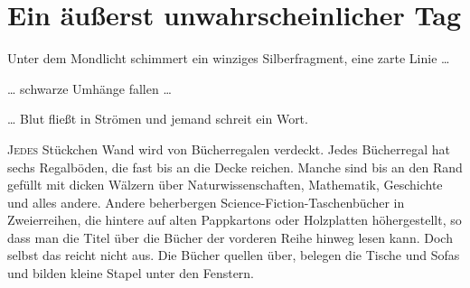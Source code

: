 \chapter[Ein äußerst unwahrscheinlicher Tag]{Ein äußerst unwahrscheinlicher Tag}

\begin{chapterOpeningQuote}
\noindent
Unter dem Mondlicht schimmert ein winziges Silberfragment, eine zarte Linie …

\vspace*{2ex}
… schwarze Umhänge fallen …

\vspace*{2ex}
… Blut fließt in Strömen und jemand schreit ein Wort.
\end{chapterOpeningQuote}

\lettrine{J}{edes} Stückchen Wand wird von Bücherregalen verdeckt. Jedes Bücherregal hat sechs Regalböden, die fast bis an die Decke reichen. Manche sind bis an den Rand gefüllt mit dicken Wälzern über Naturwissenschaften, Mathematik, Geschichte und alles andere. Andere beherbergen Science-Fiction-Taschenbücher in Zweierreihen, die hintere auf alten Pappkartons oder Holzplatten höhergestellt, so dass man die Titel über die Bücher der vorderen Reihe hinweg lesen kann. Doch selbst das reicht nicht aus. Die Bücher quellen über, belegen die Tische und Sofas und bilden kleine Stapel unter den Fenstern.

